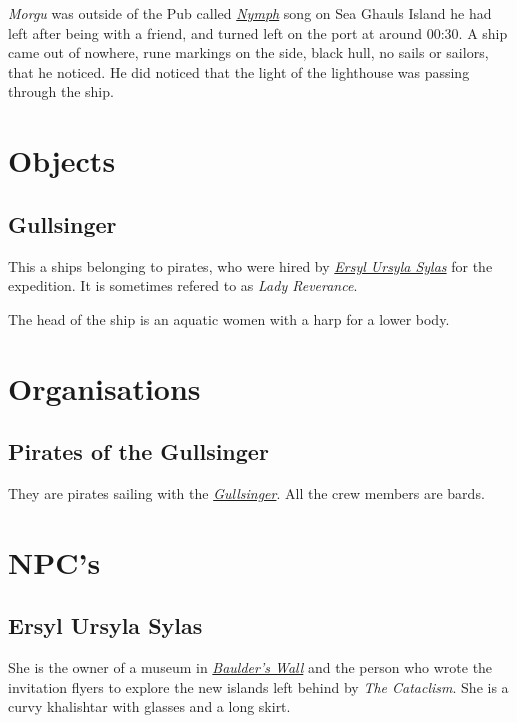 \documentclass{article}
\begin{document}
\begin{multicols}{2}
    \textit{Morgu} was outside of the Pub called \hyperref[nymph]{\textit{Nymph}} song on Sea Ghauls Island he had left after being with a friend, and turned left on the port at around 00:30. A ship came out of
    nowhere, rune markings on the side, black hull, no sails or sailors, that he noticed. He did noticed that the light of the lighthouse was passing through the ship.

    \section{Objects}
    \label{objects}

    \subsection{Gullsinger}
    \label{gullsinger}

    This a ships belonging to pirates, who were hired by \hyperref[ersyl]{\textit{Ersyl Ursyla Sylas}} for the expedition. It is sometimes refered to as \textit{Lady Reverance}.

    The head of the ship is an aquatic women with a harp for a lower body.

    \section{Organisations}
    \label{orgs}

    \subsection{Pirates of the Gullsinger}
    \label{gullsinger_pirates}

    They are pirates sailing with the \hyperref[gullsinger]{\textit{Gullsinger}}. All the crew members are bards.

    \section{NPC's}
    \label{npcs}

    \subsection{Ersyl Ursyla Sylas}
    \label{ersyl}

    She is the owner of a museum in \hyperref[baulders_wall]{\textit{Baulder's Wall}} and the person who wrote the invitation flyers to explore the new islands left behind by \textit{The Cataclism}. She is a curvy khalishtar with glasses and a
    long skirt.


\end{multicols}
\end{document}
